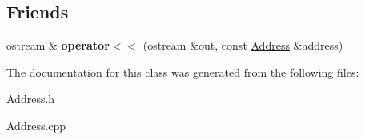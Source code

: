 \subsection*{Friends}
\begin{DoxyCompactItemize}
\item 
\mbox{\label{classAddress_aab94ff5cf244b6cd8ad7faf1bc6e6128}} 
ostream \& {\bfseries operator$<$$<$} (ostream \&out, const \hyperlink{classAddress}{Address} \&address)
\end{DoxyCompactItemize}


The documentation for this class was generated from the following files\+:\begin{DoxyCompactItemize}
\item 
Address.\+h\item 
Address.\+cpp\end{DoxyCompactItemize}
